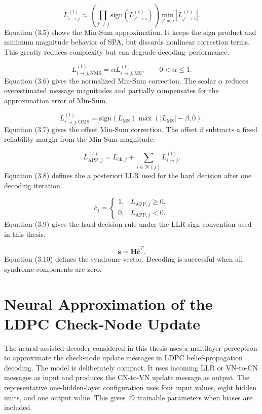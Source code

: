 \begin{equation}
L_{i\rightarrow j}^{(t)}\approx
\left(\prod_{j'\ne j}\mathrm{sign}(L_{j'\rightarrow i}^{(t)})\right)
\min_{j'\ne j}|L_{j'\rightarrow i}^{(t)}|.
\end{equation}
Equation (3.5) shows the Min-Sum approximation. It keeps the sign product and minimum magnitude behavior of SPA, but discards nonlinear correction terms. This greatly reduces complexity but can degrade decoding~performance.

\begin{equation}
L_{i\rightarrow j,\mathrm{NMS}}^{(t)}=\alpha L_{i\rightarrow j,\mathrm{MS}}^{(t)},\qquad 0<\alpha\le 1.
\end{equation}
Equation (3.6) gives the normalized Min-Sum correction. The scalar $\alpha$ reduces overestimated message magnitudes and partially compensates for the approximation error of Min-Sum.

\begin{equation}
L_{i\rightarrow j,\mathrm{OMS}}^{(t)}=\mathrm{sign}(L_{\mathrm{MS}})\max(|L_{\mathrm{MS}}|-\beta,0).
\end{equation}
Equation (3.7) gives the offset Min-Sum correction. The offset $\beta$ subtracts a fixed reliability margin from the Min-Sum magnitude.

\begin{equation}
L_{\mathrm{APP},j}^{(t)}=L_{\mathrm{ch},j}+\sum_{i\in\mathcal{N}(j)}L_{i\rightarrow j}^{(t)}.
\end{equation}
Equation (3.8) defines the a posteriori LLR used for the hard decision after one decoding iteration.

\begin{equation}
\hat{c}_j=\begin{cases}1,&L_{\mathrm{APP},j}\ge 0,\\0,&L_{\mathrm{APP},j}<0.\end{cases}
\end{equation}
Equation (3.9) gives the hard decision rule under the LLR sign convention used in this thesis.

\begin{equation}
\mathbf{s}=\mathbf{H}\hat{\mathbf{c}}^{T}.
\end{equation}
Equation (3.10) defines the syndrome vector. Decoding is successful when all syndrome components are zero.

\section{Neural Approximation of the LDPC Check-Node Update}
The neural-assisted decoder considered in this thesis uses a multilayer perceptron to approximate the check-node update messages in LDPC belief-propagation decoding. The model is deliberately compact. It uses incoming LLR or VN-to-CN messages as input and produces the CN-to-VN update message as output. The representative one-hidden-layer configuration uses four input values, eight hidden units, and one output value. This gives 49 trainable parameters when biases are included.

